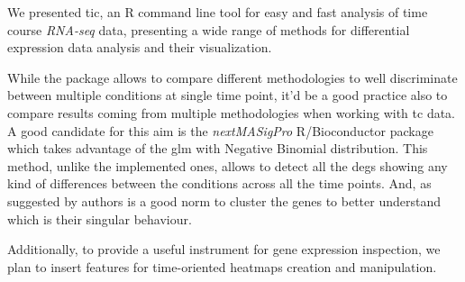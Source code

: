We presented \gls{tic}, an R command line tool for easy and fast analysis of time course \textit{RNA-seq} data, presenting a wide range of methods for differential expression data analysis and their visualization.

While the package allows to compare different methodologies to well discriminate between multiple conditions at single time point, it'd be a good practice also to compare results coming from multiple methodologies when working with \gls{tc} data.
A good candidate for this aim is the \textit{nextMASigPro} R/Bioconductor package which takes advantage of the \gls{glm} with Negative Binomial distribution.
This method, unlike the implemented ones, allows to detect all the \glspl{deg} showing any kind of differences between the conditions across all the time points.
And, as suggested by authors is a good norm to cluster the genes to better understand which is their singular behaviour.

Additionally, to provide a useful instrument for gene expression inspection, we plan to insert features for time-oriented heatmaps creation and manipulation.
